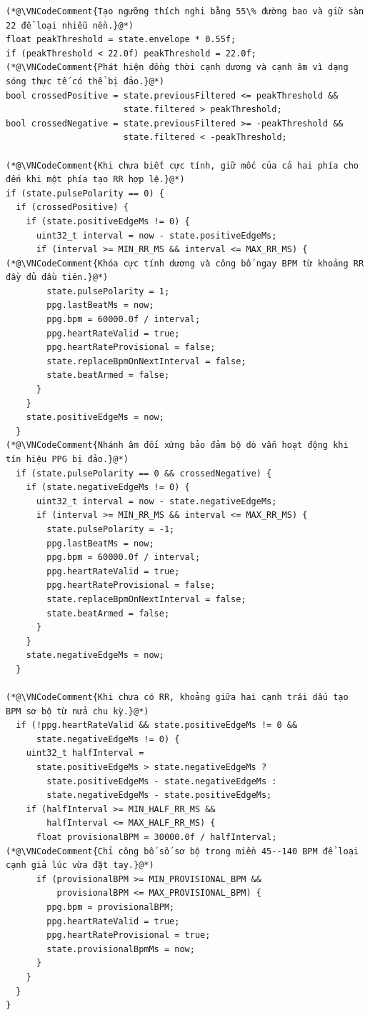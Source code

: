 \documentclass[12pt]{article}
\begin{document}
\Needspace{0.34\textheight}
\begin{lstlisting}[style=firmware,caption={Theo dõi đủ hai cực tính, xuất BPM sơ bộ và khóa bằng RR}]
(*@\VNCodeComment{Tạo ngưỡng thích nghi bằng 55\% đường bao và giữ sàn 22 để loại nhiễu nền.}@*)
float peakThreshold = state.envelope * 0.55f;
if (peakThreshold < 22.0f) peakThreshold = 22.0f;
(*@\VNCodeComment{Phát hiện đồng thời cạnh dương và cạnh âm vì dạng sóng thực tế có thể bị đảo.}@*)
bool crossedPositive = state.previousFiltered <= peakThreshold &&
                       state.filtered > peakThreshold;
bool crossedNegative = state.previousFiltered >= -peakThreshold &&
                       state.filtered < -peakThreshold;

(*@\VNCodeComment{Khi chưa biết cực tính, giữ mốc của cả hai phía cho đến khi một phía tạo RR hợp lệ.}@*)
if (state.pulsePolarity == 0) {
  if (crossedPositive) {
    if (state.positiveEdgeMs != 0) {
      uint32_t interval = now - state.positiveEdgeMs;
      if (interval >= MIN_RR_MS && interval <= MAX_RR_MS) {
(*@\VNCodeComment{Khóa cực tính dương và công bố ngay BPM từ khoảng RR đầy đủ đầu tiên.}@*)
        state.pulsePolarity = 1;
        ppg.lastBeatMs = now;
        ppg.bpm = 60000.0f / interval;
        ppg.heartRateValid = true;
        ppg.heartRateProvisional = false;
        state.replaceBpmOnNextInterval = false;
        state.beatArmed = false;
      }
    }
    state.positiveEdgeMs = now;
  }
(*@\VNCodeComment{Nhánh âm đối xứng bảo đảm bộ dò vẫn hoạt động khi tín hiệu PPG bị đảo.}@*)
  if (state.pulsePolarity == 0 && crossedNegative) {
    if (state.negativeEdgeMs != 0) {
      uint32_t interval = now - state.negativeEdgeMs;
      if (interval >= MIN_RR_MS && interval <= MAX_RR_MS) {
        state.pulsePolarity = -1;
        ppg.lastBeatMs = now;
        ppg.bpm = 60000.0f / interval;
        ppg.heartRateValid = true;
        ppg.heartRateProvisional = false;
        state.replaceBpmOnNextInterval = false;
        state.beatArmed = false;
      }
    }
    state.negativeEdgeMs = now;
  }

(*@\VNCodeComment{Khi chưa có RR, khoảng giữa hai cạnh trái dấu tạo BPM sơ bộ từ nửa chu kỳ.}@*)
  if (!ppg.heartRateValid && state.positiveEdgeMs != 0 &&
      state.negativeEdgeMs != 0) {
    uint32_t halfInterval =
      state.positiveEdgeMs > state.negativeEdgeMs ?
        state.positiveEdgeMs - state.negativeEdgeMs :
        state.negativeEdgeMs - state.positiveEdgeMs;
    if (halfInterval >= MIN_HALF_RR_MS &&
        halfInterval <= MAX_HALF_RR_MS) {
      float provisionalBPM = 30000.0f / halfInterval;
(*@\VNCodeComment{Chỉ công bố số sơ bộ trong miền 45--140 BPM để loại cạnh giả lúc vừa đặt tay.}@*)
      if (provisionalBPM >= MIN_PROVISIONAL_BPM &&
          provisionalBPM <= MAX_PROVISIONAL_BPM) {
        ppg.bpm = provisionalBPM;
        ppg.heartRateValid = true;
        ppg.heartRateProvisional = true;
        state.provisionalBpmMs = now;
      }
    }
  }
}
\end{lstlisting}
\end{document}
